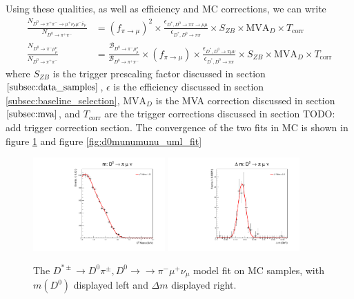Using these qualities, as well as efficiency and MC corrections, we can write
\begin{equation}
\begin{split}
    \frac{N_{D^0 \to \pi^+ \pi^- \to \mu^+ \nu_\mu \mu^- \bar{\nu}_\mu}}{N_{D^0 \to \pi^+ \pi^-}} &= \left(f_{\pi \to \mu}\right)^2 \times \frac{\epsilon_{D^*, D^0\to\pi\pi\to\mu\mu}}{\epsilon_{D^*, D^0\to\pi\pi}} \times S_{ZB} \times \text{MVA}_D \times T_{\text{corr}} \\
    \frac{N_{D^0 \to \pi^- \mu^ \nu_\mu}}{N_{D^0 \to \pi^+ \pi^-}} &=\frac{\mathcal{B}_{D^0 \to \pi^- \mu^ \nu_\mu}}{\mathcal{B}_{D^0 \to \pi^+ \pi^-}} \times \left(f_{\pi \to \mu}\right) \times \frac{\epsilon_{D^*, D^0\to\pi\mu\nu}}{\epsilon_{D^*, D^0\to\pi\pi}} \times S_{ZB} \times \text{MVA}_D \times T_{\text{corr}}
    \label{eq:peaking_background_yield_calculation}
\end{split}
\end{equation}
where $S_{ZB}$ is the trigger prescaling factor discussed in section $\ref{subsec:data_samples}$, $\epsilon$ is the efficiency discussed in section \ref{subsec:baseline_selection}, $\text{MVA}_D$ is the MVA correction discussed in section $\ref{subsec:mva}$, and $T_{\text{corr}}$ are the trigger corrections discussed in section TODO: add trigger correction section. The convergence of the two fits in MC is shown in figure \ref{fig:d0pimunu_uml_fit} and figure \ref{fig:d0munumunu_uml_fit}

\begin{figure}[htp]
    \begin{center}
      \includegraphics[width=0.45\textwidth]{figures/chapter4/signal_fit/d0pimunu_2022_2023_0_m.pdf}
      \includegraphics[width=0.45\textwidth]{figures/chapter4/signal_fit/d0pimunu_2022_2023_0_dm.pdf}\\
    \end{center}
    \caption{
      The $D^{*\pm} \to D^0\pi^\pm, D^0 \to \to \pi^- \mu^+ \nu_\mu$ model fit on MC samples, with $m(D^0)$ displayed left and $\Delta m$ displayed right.
    }
    \label{fig:d0pimunu_uml_fit}
\end{figure}


